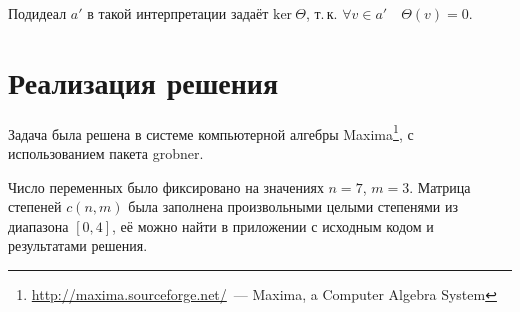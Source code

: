 \documentclass[a4paper,12pt]{article}
\begin{document}
Подидеал $a'$ в такой интерпретации задаёт $\textrm{ker}\ \Theta$, т.\,к. $\forall v \in a' \quad \Theta(v) = 0$.

\section{Реализация решения}
Задача была решена в системе компьютерной алгебры 
Maxima\footnote{\url{http://maxima.sourceforge.net/}~--- Maxima, a Computer Algebra System}, 
с использованием пакета grobner.

Число переменных было фиксировано на значениях $n = 7$, $m = 3$.
Матрица степеней $c(n, m)$ была заполнена произвольными целыми степенями из диапазона $[0, 4]$,
её можно найти в приложении с исходным кодом и результатами решения.


\end{document}
